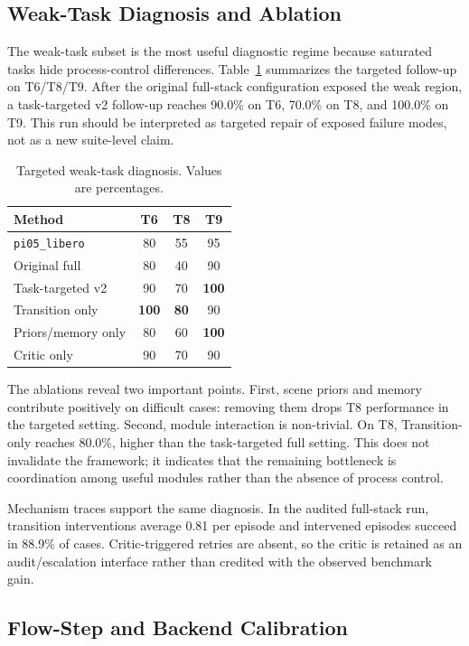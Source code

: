 \documentclass[runningheads]{waica}
\begin{document}
\subsection{Weak-Task Diagnosis and Ablation}

The weak-task subset is the most useful diagnostic regime because saturated tasks hide process-control differences.
Table~\ref{tab:weak} summarizes the targeted follow-up on T6/T8/T9.
After the original full-stack configuration exposed the weak region, a task-targeted v2 follow-up reaches 90.0\% on T6, 70.0\% on T8, and 100.0\% on T9.
This run should be interpreted as targeted repair of exposed failure modes, not as a new suite-level claim.

\begin{table}
\caption{Targeted weak-task diagnosis. Values are percentages.}
\label{tab:weak}
\centering
\small
\begin{tabular}{lccc}
\toprule
Method & T6 & T8 & T9 \\
\midrule
\texttt{pi05\_libero} & 80 & 55 & 95 \\
Original full & 80 & 40 & 90 \\
Task-targeted v2 & 90 & 70 & \textbf{100} \\
Transition only & \textbf{100} & \textbf{80} & 90 \\
Priors/memory only & 80 & 60 & \textbf{100} \\
Critic only & 90 & 70 & 90 \\
\bottomrule
\end{tabular}
\end{table}

The ablations reveal two important points.
First, scene priors and memory contribute positively on difficult cases: removing them drops T8 performance in the targeted setting.
Second, module interaction is non-trivial.
On T8, Transition-only reaches 80.0\%, higher than the task-targeted full setting.
This does not invalidate the framework; it indicates that the remaining bottleneck is coordination among useful modules rather than the absence of process control.

Mechanism traces support the same diagnosis. In the audited full-stack run,
transition interventions average 0.81 per episode and intervened episodes
succeed in 88.9\% of cases. Critic-triggered retries are absent, so the critic
is retained as an audit/escalation interface rather than credited with the
observed benchmark gain.

\subsection{Flow-Step and Backend Calibration}
\end{document}
